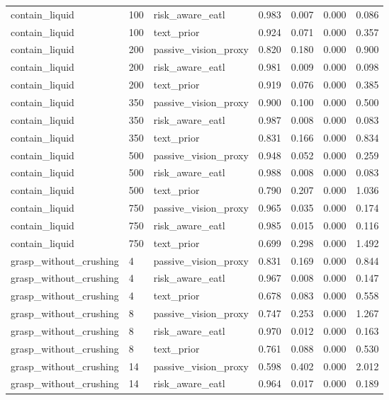 \begin{tabular}{lllrrrr}
contain\_liquid & 100 & risk\_aware\_eatl & 0.983 & 0.007 & 0.000 & 0.086 \\
contain\_liquid & 100 & text\_prior & 0.924 & 0.071 & 0.000 & 0.357 \\
contain\_liquid & 200 & passive\_vision\_proxy & 0.820 & 0.180 & 0.000 & 0.900 \\
contain\_liquid & 200 & risk\_aware\_eatl & 0.981 & 0.009 & 0.000 & 0.098 \\
contain\_liquid & 200 & text\_prior & 0.919 & 0.076 & 0.000 & 0.385 \\
contain\_liquid & 350 & passive\_vision\_proxy & 0.900 & 0.100 & 0.000 & 0.500 \\
contain\_liquid & 350 & risk\_aware\_eatl & 0.987 & 0.008 & 0.000 & 0.083 \\
contain\_liquid & 350 & text\_prior & 0.831 & 0.166 & 0.000 & 0.834 \\
contain\_liquid & 500 & passive\_vision\_proxy & 0.948 & 0.052 & 0.000 & 0.259 \\
contain\_liquid & 500 & risk\_aware\_eatl & 0.988 & 0.008 & 0.000 & 0.083 \\
contain\_liquid & 500 & text\_prior & 0.790 & 0.207 & 0.000 & 1.036 \\
contain\_liquid & 750 & passive\_vision\_proxy & 0.965 & 0.035 & 0.000 & 0.174 \\
contain\_liquid & 750 & risk\_aware\_eatl & 0.985 & 0.015 & 0.000 & 0.116 \\
contain\_liquid & 750 & text\_prior & 0.699 & 0.298 & 0.000 & 1.492 \\
grasp\_without\_crushing & 4 & passive\_vision\_proxy & 0.831 & 0.169 & 0.000 & 0.844 \\
grasp\_without\_crushing & 4 & risk\_aware\_eatl & 0.967 & 0.008 & 0.000 & 0.147 \\
grasp\_without\_crushing & 4 & text\_prior & 0.678 & 0.083 & 0.000 & 0.558 \\
grasp\_without\_crushing & 8 & passive\_vision\_proxy & 0.747 & 0.253 & 0.000 & 1.267 \\
grasp\_without\_crushing & 8 & risk\_aware\_eatl & 0.970 & 0.012 & 0.000 & 0.163 \\
grasp\_without\_crushing & 8 & text\_prior & 0.761 & 0.088 & 0.000 & 0.530 \\
grasp\_without\_crushing & 14 & passive\_vision\_proxy & 0.598 & 0.402 & 0.000 & 2.012 \\
grasp\_without\_crushing & 14 & risk\_aware\_eatl & 0.964 & 0.017 & 0.000 & 0.189 \\

\end{tabular}
